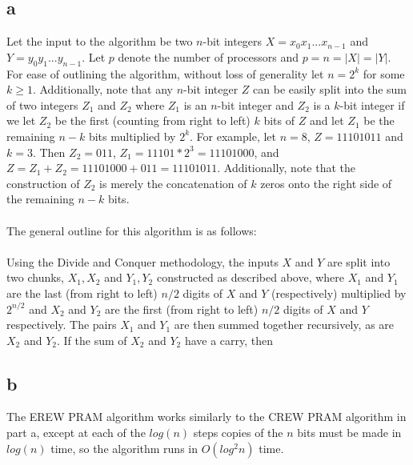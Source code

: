 \documentclass[letterpaper,notitlepage,twoside]{article}
\begin{document}
\subsection*{a}
Let the input to the algorithm be two $n$-bit integers $X = x_0x_1...x_{n-1}$ and $Y = y_0y_1...y_{n-1}$. Let $p$ denote the number of processors and $p = n = |X| = |Y|$. For ease of outlining the algorithm, without loss of generality let $n = 2^k$ for some $k \geq 1$. Additionally, note that any $n$-bit integer $Z$ can be easily split into the sum of two integers $Z_1$ and $Z_2$ where $Z_1$ is an $n$-bit integer and $Z_2$ is a $k$-bit integer if we let $Z_2$ be the first (counting from right to left) $k$ bits of $Z$ and let $Z_1$ be the remaining $n-k$ bits multiplied by $2^{k}$. For example, let $n = 8$, $Z = 11101011$ and $k = 3$. Then $Z_2= 011$, $Z_1 = 11101 * 2^{3} = 11101000$, and $Z = Z_1 + Z_2 = 11101000 + 011 = 11101011$. Additionally, note that the construction of $Z_2$ is merely the concatenation of $k$ zeros onto the right side of the remaining $n-k$ bits. 
\\\\
The general outline for this algorithm is as follows:
\\\\
Using the Divide and Conquer methodology, the inputs $X$ and $Y$ are split into two chunks, $X_1, X_2$ and $Y_1, Y_2$ constructed as described above, where $X_1$ and $Y_1$ are the last (from right to left) $n/2$ digits of $X$ and $Y$ (respectively) multiplied by $2^{n/2}$ and $X_2$ and $Y_2$ are the first (from right to left) $n/2$ digits of $X$ and $Y$ respectively. The pairs $X_1$ and $Y_1$ are then summed together recursively, as are $X_2$ and $Y_2$. If the sum of $X_2$ and $Y_2$ have a carry, then 
\subsection*{b}
The EREW PRAM algorithm works similarly to the CREW PRAM algorithm in part a, except at each of the $log(n)$ steps copies of the $n$ bits must be made in $log(n)$ time, so the algorithm runs in $O(log^{2} n)$ time.
\end{document}
